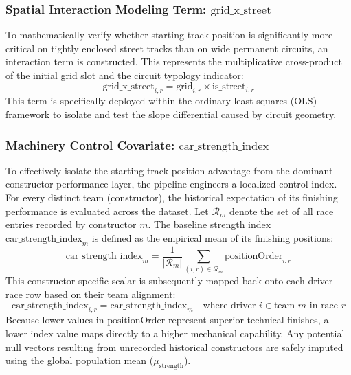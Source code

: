 \subsubsection{Spatial Interaction Modeling Term: $\text{grid\_x\_street}$ }
To mathematically verify whether starting track position is significantly more critical on tightly enclosed street tracks than on wide permanent circuits, an interaction term is constructed. This represents the multiplicative cross-product of the initial grid slot and the circuit typology indicator:
\begin{equation}
\text{grid\_x\_street}_{i,r} = \text{grid}_{i,r} \times \text{is\_street}_{i,r}
\end{equation}
This term is specifically deployed within the ordinary least squares (OLS) framework to isolate and test the slope differential caused by circuit geometry.

\subsubsection{Machinery Control Covariate: $\text{car\_strength\_index}$}
To effectively isolate the starting track position advantage from the dominant constructor performance layer, the pipeline engineers a localized control index. For every distinct team (constructor), the historical expectation of its finishing performance is evaluated across the dataset. Let $\mathcal{R}_m$ denote the set of all race entries recorded by constructor $m$. The baseline strength index $\text{car\_strength\_index}_{m}$ is defined as the empirical mean of its finishing positions:
\begin{equation}
\text{car\_strength\_index}_{m} = \frac{1}{|\mathcal{R}_m|} \sum_{(i,r) \in \mathcal{R}_m} \text{positionOrder}_{i,r}
\end{equation}
This constructor-specific scalar is subsequently mapped back onto each driver-race row based on their team alignment:
\begin{equation}
\text{car\_strength\_index}_{i,r} = \text{car\_strength\_index}_{m} \quad \text{where } \text{driver } i \in \text{team } m \text{ in race } r
\end{equation}
Because lower values in $\text{positionOrder}$ represent superior technical finishes, a lower index value maps directly to a higher mechanical capability. Any potential null vectors resulting from unrecorded historical constructors are safely imputed using the global population mean ($\mu_{\text{strength}}$).
